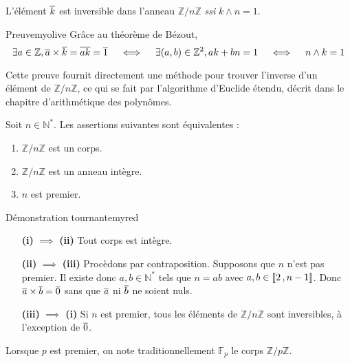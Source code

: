     \begin{prop}{}{}
        L’élément $\overline{k}$ est inversible dans l’anneau $\mathbb{Z} / n \mathbb{Z}$ \textit{ssi} $k \wedge n = 1$.
    \end{prop}

    \begin{demo}{Preuve}{myolive}
        Grâce au théorème de Bézout, 
        \[ \exists a \in \mathbb{Z}, \overline{a} \times \overline{k} = \overline{a k} = \overline{1} \quad \iff \quad \exists (a,b) \in \mathbb{Z}^2, ak + bn = 1 \quad \iff \quad n \wedge k = 1 \]
    \end{demo}

    Cette preuve fournit directement une méthode pour trouver l’inverse d’un élément de $\mathbb{Z} / n \mathbb{Z}$, ce qui se fait par l’algorithme d’Euclide étendu, décrit dans le chapitre d’arithmétique des polynômes.

    \begin{theo}{}{}
        Soit $n \in \mathbb{N}^*$. Les assertions suivantes sont équivalentes :
        \begin{enumerate}
            \item $\mathbb{Z} / n \mathbb{Z}$ est un corps.
            \item $\mathbb{Z} / n \mathbb{Z}$ est un anneau intègre.
            \item $n$ est premier.
        \end{enumerate}
    \end{theo}

    \begin{demo}{Démonstration tournante}{myred}
        \begin{itemize}[leftmargin=2cm]
            \item[\textbf{(i)} $\implies$ \textbf{(ii)}] Tout corps est intègre.
            \item[\textbf{(ii)} $\implies$ \textbf{(iii)}] Procèdons par contraposition. Supposons que $n$ n’est pas premier. Il existe donc $a,b \in \mathbb{N}^*$ tels que $n = ab$ avec $a,b \in \left\llbracket 2 \, , n-1 \right\rrbracket$. Donc $\overline{a} \times \overline{b} = \overline{0}$ sans que $\overline{a}$ ni $\overline{b}$ ne soient nuls.
            \item[\textbf{(iii)} $\implies$ \textbf{(i)}] Si $n$ est premier, tous les éléments de $\mathbb{Z} / n \mathbb{Z}$ sont inversibles, à l’exception de $\overline{0}$.
        \end{itemize}
    \end{demo}

    Lorsque $p$ est premier, on note traditionnellement $\mathbb{F}_p$ le corps $\mathbb{Z} / p \mathbb{Z}$.

